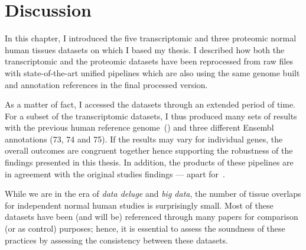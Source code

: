 \section{Discussion}

In this chapter, I introduced the five transcriptomic and three proteomic normal
human tissues datasets on which I based my thesis.
I described how both the transcriptomic and the proteomic datasets have been
reprocessed from raw files with state-of-the-art unified pipelines
which are also using the same genome built and annotation references in the
final processed version.

As a matter of fact, I accessed the datasets through an extended period of time.
For a subset of the transcriptomic datasets,
I thus produced many sets of results with
the previous human reference genome~() and
three different \gls{Ensembl} annotations (73, 74 and 75).
If the results may vary for individual genes,
the overall outcomes are congruent together hence
supporting the robustness of the findings presented in this thesis.
In addition, the products of these pipelines are in agreement with the original
studies findings --- apart for~.

While we are in the era of \emph{data deluge} and \emph{big data},
the number of tissue overlaps for independent normal human studies is surprisingly small.
Most of these datasets have been (and will be) referenced through
many papers for comparison (or as control) purposes;
hence, it is essential to assess the soundness of these practices by assessing
the consistency between these datasets.

